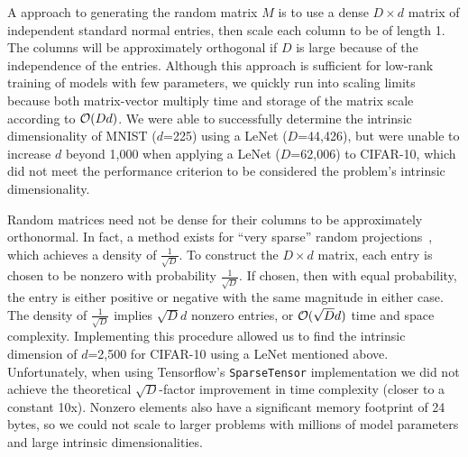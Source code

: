 \documentclass{article} %
\begin{document}
A \naive approach to generating the random matrix $M$ is to use a dense $D \times d$ matrix of independent standard normal entries, then scale each column to be of length 1. The columns will be approximately orthogonal if $D$ is large because of the independence of the entries. Although this approach is sufficient for low-rank training of models with few parameters, we quickly run into scaling limits because both matrix-vector multiply time and storage of the matrix scale according to $\mathcal{O}(Dd)$. We were able to successfully determine the intrinsic dimensionality of MNIST ($d$=225) using a LeNet ($D$=44,426), but were unable to increase $d$ beyond 1,000 when applying a LeNet ($D$=62,006) to CIFAR-10, which did not meet the performance criterion to be considered the problem’s intrinsic dimensionality.

Random matrices need not be dense for their columns to be approximately orthonormal. In fact, a method exists for ``very sparse'' random projections~\citep{li2006verysparse}, which achieves a density of $\frac{1}{\sqrt{D}}$. To construct the $D \times d$ matrix, each entry is chosen to be nonzero with probability $\frac{1}{\sqrt{D}}$.  If chosen, then with equal probability, the entry is either positive or negative with the same magnitude in either case. The density of $\frac{1}{\sqrt{D}}$ implies $\sqrt{D}d$ nonzero entries, or $\mathcal{O}(\sqrt{D}d)$ time and space complexity. Implementing this procedure allowed us to find the intrinsic dimension of $d$=2,500 for CIFAR-10 using a LeNet mentioned above. Unfortunately, when using Tensorflow's \texttt{SparseTensor} implementation we did not achieve the theoretical $\sqrt{D}$-factor improvement in time complexity (closer to a constant 10x). Nonzero elements also have a significant memory footprint of 24 bytes, so we could not scale to larger problems with millions of model parameters and large intrinsic dimensionalities.
\end{document}
